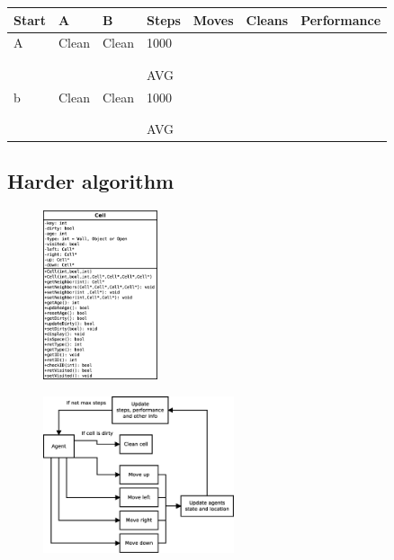 \begin{longtable}{p{} p{} p{} 
									p{} p{} p{} 
									p{}}
Start	& A & B & Steps & Moves & Cleans & Performance \\\hline
A & Clean & Clean & 1000 
		 &  &  &  \\
	&&&&  &  &  \\
	&&&&  &  &  \\\hline
  &&&  AVG &  &  &  \\\hline
b & Clean & Clean & 1000 
		 &  &  &  \\
	&&&&  &  &  \\
	&&&&  &  &  \\\hline
  &&&  AVG &  &  &  \\\hline
\end{longtable}


\subsection{Harder algorithm}


\begin{figure}[h] \label{fig:}	\centering
\includegraphics[width=0.3\textwidth]{cell_uml}
\caption{}
\end{figure}

\begin{figure}[h] \label{fig:}	\centering
\includegraphics[width=0.5\textwidth]{agent}
\caption{}
\end{figure}

